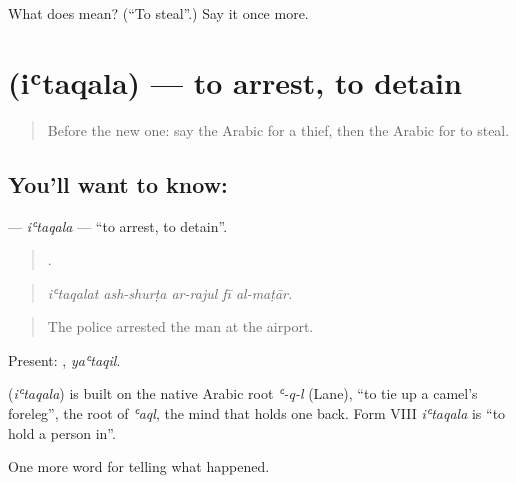 \begin{tcolorbox}[breakable,colback=teal!4,colframe=teal!35!black,title={Before you move on}]
What does  mean? (\textquotedblleft{}To steal\textquotedblright{}.) Say it once more.
\end{tcolorbox}
\section[\texorpdfstring{\ar{اعتقل} (iʿtaqala)}{اعتقل (iʿtaqala)}]{ (iʿtaqala) — to arrest, to detain}

\label{lesson:AR-C300-itaqala}



\begin{quote}
Before the new one: say the Arabic for a thief, then the Arabic for to steal.
\end{quote}

\subsection*{You'll want to know: }
\textbf{} — \emph{iʿtaqala} — \textquotedblleft{}to arrest, to detain\textquotedblright{}.

\begin{quote}
    .
\end{quote}

\begin{quote}
\emph{iʿtaqalat ash-shurṭa ar-rajul fī al-maṭār.}
\end{quote}

\begin{quote}
The police arrested the man at the airport.
\end{quote}

Present: , \emph{yaʿtaqil}.

\begin{cousinweb}
\textbf{} (\emph{iʿtaqala}) is built on the native Arabic root \emph{ʿ-q-l} (Lane), \textquotedblleft{}to tie up a camel's foreleg\textquotedblright{}, the root of \emph{ʿaql}, the mind that holds one back. Form VIII \emph{iʿtaqala} is \textquotedblleft{}to hold a person in\textquotedblright{}.
\end{cousinweb}

\begin{grammarlens}[title={What you've built}]
One more word for telling what happened.
\end{grammarlens}

